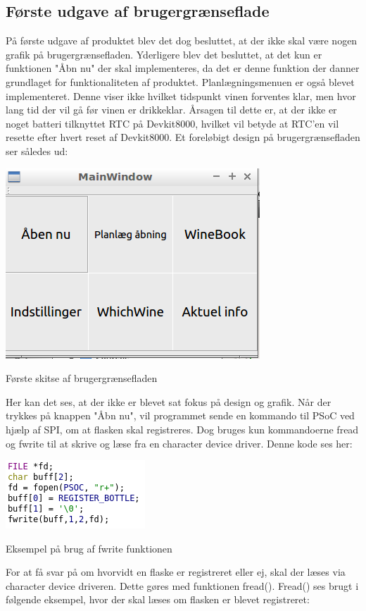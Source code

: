 \subsection*{Første udgave af brugergrænseflade}
På første udgave af produktet blev det dog besluttet, at der ikke skal være nogen grafik på brugergrænsefladen. Yderligere blev det besluttet, at det kun er funktionen "Åbn nu" der skal implementeres, da det er denne funktion der danner grundlaget for funktionaliteten af produktet. Planlægningsmenuen er også blevet implementeret. Denne viser ikke hvilket tidspunkt vinen forventes klar, men hvor lang tid der vil gå før vinen er drikkeklar. Årsagen til dette er, at der ikke er noget batteri tilknyttet RTC på Devkit8000, hvilket vil betyde at RTC'en vil resette efter hvert reset af Devkit8000.
Et foreløbigt design på brugergrænsefladen ser således ud:

\includegraphics{Billeder/real_skitse}
\caption{Første skitse af brugergrænsefladen}

Her kan det ses, at der ikke er blevet sat fokus på design og grafik. Når der trykkes på knappen "Åbn nu", vil programmet sende en kommando til PSoC ved hjælp af SPI, om at flasken skal registreres. Dog bruges kun kommandoerne fread og fwrite til at skrive og læse fra en character device driver. Denne kode ses her:

\includegraphics{Billeder/write}
\caption{Eksempel på brug af fwrite funktionen}

For at få svar på om hvorvidt en flaske er registreret eller ej, skal der læses via character device driveren. Dette gøres med funktionen fread(). Fread() ses brugt i følgende eksempel, hvor der skal læses om flasken er blevet registreret:

